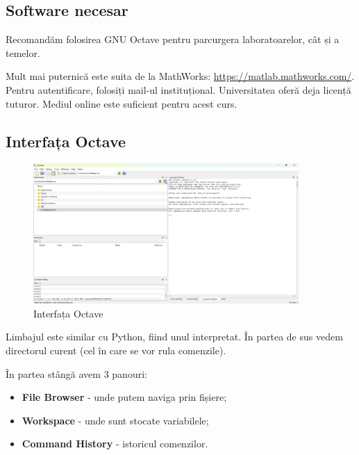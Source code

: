 \documentclass{exam}
\begin{document}
\subsection{Software necesar}

\par Recomandăm folosirea GNU Octave pentru parcurgera laboratoarelor, cât și a temelor.

\par Mult mai puternică este suita de la MathWorks: \url{https://matlab.mathworks.com/}.
Pentru autentificare, folosiți mail-ul instituțional.
Universitatea oferă deja licență tuturor. Mediul online este suficient pentru
acest curs.

\newpage
\subsection{Interfața Octave}

\begin{figure}[ht]
	\centering
	\includegraphics[width=0.9\textwidth]{interf}
	\caption{Interfața Octave}
\end{figure}

\par Limbajul este similar cu Python, fiind unul interpretat. În partea de sus
vedem directorul curent (cel în care se vor rula comenzile).

\par În partea stângă avem 3 panouri:

\begin{itemize}
	\item \textbf{File Browser} - unde putem naviga prin fișiere;
	\item \textbf{Workspace} - unde sunt stocate variabilele;
	\item \textbf{Command History} - istoricul comenzilor.
\end{itemize}
\end{document}
